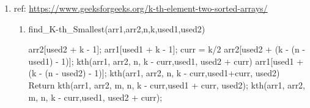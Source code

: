 \documentclass{article}
\begin{document}
\begin{CJK*}{UTF8}{bsmi}
\begin{enumerate}
    \item ref: \url{ https://www.geeksforgeeks.org/k-th-element-two-sorted-arrays/} 
    \begin{enumerate}
        \item \begin{algorithm}[H]
        \caption{find\_K-th\_Smallest(arr1,arr2,n,k,used1,used2)}
        \begin{algorithmic}
            \State \Return arr2[used2 + k - 1];
        \EndIf
            \State \Return arr1[used1 + k - 1];
        \EndIf
        \State curr = k/2
         
                \State \Return arr2[used2 + (k - (n - used1) - 1)];
            \Else
                \State \Return kth(arr1, arr2, n, k - curr,used1, used2 + curr)
            \EndIf
        \EndIf
         
                \State \Return arr1[used1 + (k - (n - used2) - 1)];
            \Else
                \State \Return kth(arr1, arr2, n, k - curr,used1+curr, used2)
            \EndIf
        \Else
              
                \State Return kth(arr1, arr2, m, n, k - curr,used1 + curr, used2);
            \Else
                \State \Return kth(arr1, arr2, m, n, k - curr,used1, used2 + curr);
            \EndIf
        \EndIf
        \end{algorithmic}
        \end{algorithm}
    

\end{enumerate}
\end{enumerate}
\end{CJK*}
\end{document}
